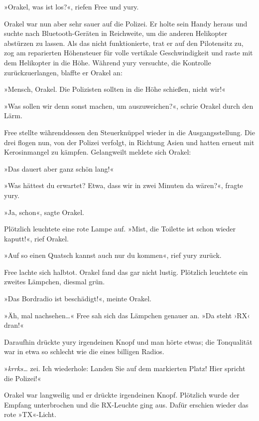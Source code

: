 »Orakel, was ist los?«, riefen Free und yury.


Orakel war nun aber sehr sauer auf die Polizei. Er holte sein Handy heraus und suchte nach Bluetooth-Geräten in Reichweite, um die anderen Helikopter abstürzen zu lassen. Als das nicht funktionierte, trat er auf den Pilotensitz zu, zog am reparierten Höhensteuer für volle vertikale Geschwindigkeit und raste mit dem Helikopter in die Höhe. Während yury versuchte, die Kontrolle zurückzuerlangen, blaffte er Orakel an:

»Mensch, Orakel. Die Polizisten sollten in die Höhe schießen, nicht wir!«

»Was sollen wir denn sonst machen, um auszuweichen?«, schrie Orakel durch den Lärm.

Free stellte währenddessen den Steuerknüppel wieder in die Ausgangsstellung. Die drei flogen nun, von der Polizei verfolgt, in Richtung Asien und hatten erneut mit Kerosinmangel zu kämpfen. Gelangweilt meldete sich Orakel:

»Das dauert aber ganz schön lang!«

»Was hättest du erwartet? Etwa, dass wir in zwei Minuten da wären?«, fragte yury.

»Ja, schon«, sagte Orakel.

Plötzlich leuchtete eine rote Lampe auf. »Mist, die Toilette ist schon wieder kaputt!«, rief Orakel.

»Auf so einen Quatsch kannst auch nur du kommen«, rief yury zurück.

Free lachte sich halbtot. Orakel fand das gar nicht lustig. Plötzlich leuchtete ein zweites Lämpchen, diesmal grün.

»Das Bordradio ist beschädigt!«, meinte Orakel.

»Äh, mal nachsehen…« Free sah sich das Lämpchen genauer an. »Da steht ›RX‹ dran!«

Daraufhin drückte yury irgendeinen Knopf und man hörte etwas; die Tonqualität war in etwa so schlecht wie die eines billigen Radios.

»\textit{krrks…} zei. Ich wiederhole: Landen Sie auf dem markierten Platz! Hier spricht die Polizei!«

Orakel war langweilig und er drückte irgendeinen Knopf. Plötzlich wurde der Empfang unterbrochen und die RX-Leuchte ging aus. Dafür erschien wieder das rote »TX«-Licht.

